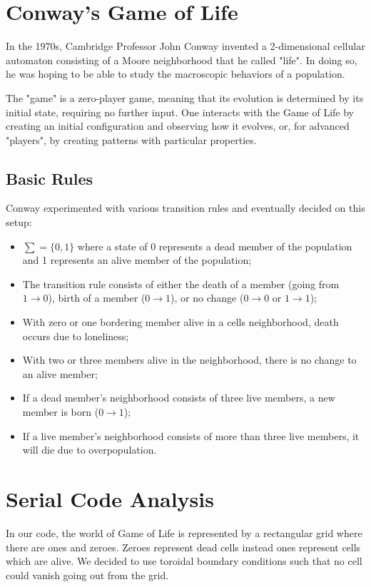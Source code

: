 \documentclass[a4paper,11pt,twoside]{report}
\begin{document}
\chapter{Conway's Game of Life}\label{Conway}

In the 1970s, Cambridge Professor John Conway invented a 2-dimensional cellular automaton consisting of a Moore neighborhood that he called "life". In doing so, he was hoping to be able to study the macroscopic behaviors of a population.

\noindent The "game" is a zero-player game, meaning that its evolution is determined by its initial state, requiring no further input. One interacts with the Game of Life by creating an initial configuration and observing how it evolves, or, for advanced "players", by creating patterns with particular properties.

\section{Basic Rules}
Conway experimented with various transition rules and eventually decided on this setup:
\begin{itemize}

	\item $\sum = \{0, 1\}$ where a state of 0 represents a dead member of the population    and 1 represents an alive member of the population;
	\item The transition rule consists of either the death of a member (going from $1 \rightarrow 0$), birth of a member ($0 \rightarrow 1$), or no change ($0 \rightarrow 0$ or $1 \rightarrow 1$);
	\item With zero or one bordering member alive in a cells neighborhood, death occurs due to loneliness;
	\item With two or three members alive in the neighborhood, there is no change to an alive member;
	\item If a dead member's neighborhood consists of three live members, a new member is born ($0 \rightarrow 1$);
	\item If a live member's neighborhood consists of more than three live members, it will die due to overpopulation.
\end{itemize}


\chapter {Serial Code Analysis}

In our code, the world of Game of Life is represented by a rectangular grid where there are ones and zeroes. Zeroes represent dead cells instead ones represent cells which are alive. We decided to use toroidal boundary conditions such that no cell could vanish going out from the grid.
\end{document}
